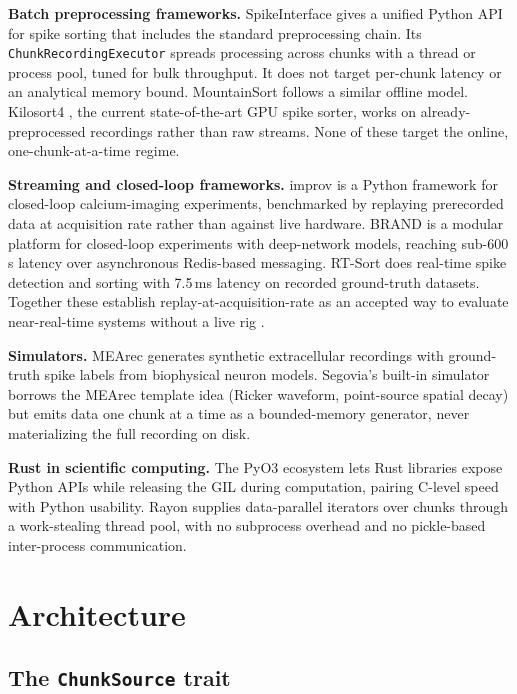 \documentclass[11pt]{article}
\begin{document}
\textbf{Batch preprocessing frameworks.} SpikeInterface \citep{Buccino2020} gives a unified Python API
for spike sorting that includes the standard preprocessing chain. Its \texttt{ChunkRecordingExecutor}
spreads processing across chunks with a thread or process pool, tuned for bulk throughput. It does not
target per-chunk latency or an analytical memory bound. MountainSort \citep{Chung2017} follows a
similar offline model. Kilosort4 \citep{Pachitariu2024}, the current state-of-the-art GPU spike
sorter, works on already-preprocessed recordings rather than raw streams. None of these target the
online, one-chunk-at-a-time regime.

\textbf{Streaming and closed-loop frameworks.} improv \citep{Draelos2025} is a Python framework for
closed-loop calcium-imaging experiments, benchmarked by replaying prerecorded data at acquisition rate
rather than against live hardware. BRAND \citep{Ali2024} is a modular platform for closed-loop
experiments with deep-network models, reaching sub-600\,\textmu s latency over asynchronous
Redis-based messaging. RT-Sort \citep{vanderMolen2024} does real-time spike detection and sorting with
7.5\,ms latency on recorded ground-truth datasets. Together these establish replay-at-acquisition-rate
as an accepted way to evaluate near-real-time systems without a live rig \citep{Hoefler2015}.

\textbf{Simulators.} MEArec \citep{BuccinoMEArec2020} generates synthetic extracellular recordings
with ground-truth spike labels from biophysical neuron models. Segovia's built-in simulator borrows
the MEArec template idea (Ricker waveform, point-source spatial decay) but emits data one chunk at a
time as a bounded-memory generator, never materializing the full recording on disk.

\textbf{Rust in scientific computing.} The PyO3 ecosystem \citep{PyO3} lets Rust libraries expose
Python APIs while releasing the GIL during computation, pairing C-level speed with Python usability.
Rayon \citep{Rayon} supplies data-parallel iterators over chunks through a work-stealing thread pool,
with no subprocess overhead and no pickle-based inter-process communication.

\section{Architecture}

\subsection{The \texttt{ChunkSource} trait}
\end{document}
